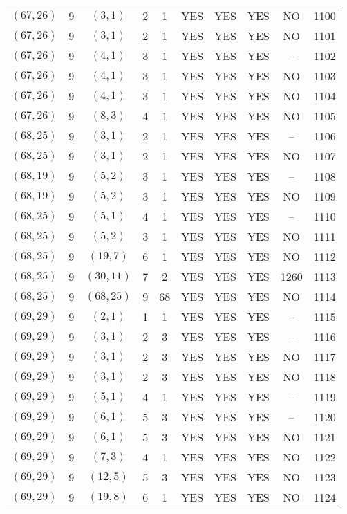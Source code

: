 \begin{longtable}{|c|c|c|c|c|c|c|c|c|c|}
$(67, 26)$ & 9 & $(3, 1)$ & 2 & 1 & YES & YES & YES & NO & 1100\\
$(67, 26)$ & 9 & $(3, 1)$ & 2 & 1 & YES & YES & YES & NO & 1101\\
$(67, 26)$ & 9 & $(4, 1)$ & 3 & 1 & YES & YES & YES & -- & 1102\\
$(67, 26)$ & 9 & $(4, 1)$ & 3 & 1 & YES & YES & YES & NO & 1103\\
$(67, 26)$ & 9 & $(4, 1)$ & 3 & 1 & YES & YES & YES & NO & 1104\\
$(67, 26)$ & 9 & $(8, 3)$ & 4 & 1 & YES & YES & YES & NO & 1105\\
$(68, 25)$ & 9 & $(3, 1)$ & 2 & 1 & YES & YES & YES & -- & 1106\\
$(68, 25)$ & 9 & $(3, 1)$ & 2 & 1 & YES & YES & YES & NO & 1107\\
$(68, 19)$ & 9 & $(5, 2)$ & 3 & 1 & YES & YES & YES & -- & 1108\\
$(68, 19)$ & 9 & $(5, 2)$ & 3 & 1 & YES & YES & YES & NO & 1109\\
$(68, 25)$ & 9 & $(5, 1)$ & 4 & 1 & YES & YES & YES & -- & 1110\\
$(68, 25)$ & 9 & $(5, 2)$ & 3 & 1 & YES & YES & YES & NO & 1111\\
$(68, 25)$ & 9 & $(19, 7)$ & 6 & 1 & YES & YES & YES & NO & 1112\\
$(68, 25)$ & 9 & $(30, 11)$ & 7 & 2 & YES & YES & YES & 1260 & 1113\\
$(68, 25)$ & 9 & $(68, 25)$ & 9 & 68 & YES & YES & YES & NO & 1114\\
$(69, 29)$ & 9 & $(2, 1)$ & 1 & 1 & YES & YES & YES & -- & 1115\\
$(69, 29)$ & 9 & $(3, 1)$ & 2 & 3 & YES & YES & YES & -- & 1116\\
$(69, 29)$ & 9 & $(3, 1)$ & 2 & 3 & YES & YES & YES & NO & 1117\\
$(69, 29)$ & 9 & $(3, 1)$ & 2 & 3 & YES & YES & YES & NO & 1118\\
$(69, 29)$ & 9 & $(5, 1)$ & 4 & 1 & YES & YES & YES & -- & 1119\\
$(69, 29)$ & 9 & $(6, 1)$ & 5 & 3 & YES & YES & YES & -- & 1120\\
$(69, 29)$ & 9 & $(6, 1)$ & 5 & 3 & YES & YES & YES & NO & 1121\\
$(69, 29)$ & 9 & $(7, 3)$ & 4 & 1 & YES & YES & YES & NO & 1122\\
$(69, 29)$ & 9 & $(12, 5)$ & 5 & 3 & YES & YES & YES & NO & 1123\\
$(69, 29)$ & 9 & $(19, 8)$ & 6 & 1 & YES & YES & YES & NO & 1124\\

\end{longtable}
